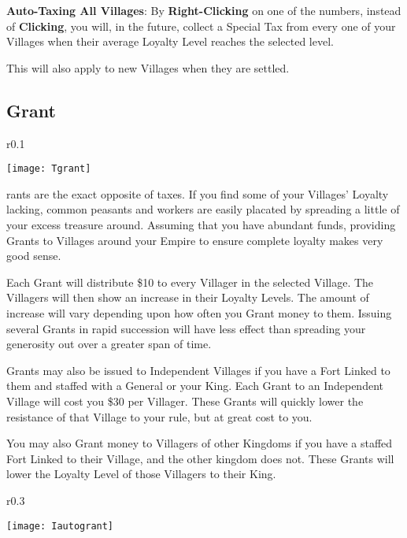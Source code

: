 \textbf{Auto-Taxing All Villages}: By \textbf{Right-Clicking} on one of the numbers, instead of \textbf{Clicking}, you will, in the future, collect a Special Tax from every one of your Villages when their average Loyalty Level reaches the selected level.

This will also apply to new Villages when they are settled.

\subsection{\textsf{Grant}}


\begin{wrapfigure}{r}{0.1\textwidth}
    \vspace{-20pt}
    \begin{center}
        \texttt{[image: Tgrant]}
    \end{center}
    \vspace{-20pt}
\end{wrapfigure}

rants are the exact opposite of taxes. If you find some of your Villages’ Loyalty lacking, common peasants and workers are easily placated by spreading a little of your excess treasure around. Assuming that you have abundant funds, providing Grants to Villages around your Empire to ensure complete loyalty makes very good sense.

Each Grant will distribute \$10 to every Villager in the selected Village. The Villagers will then show an increase in their Loyalty Levels. The amount of increase will vary depending upon how often you Grant money to them. Issuing several Grants in rapid succession will have less effect than spreading your generosity out over a greater span of time.

Grants may also be issued to Independent Villages if you have a Fort Linked to them and staffed with a General or your King. Each Grant to an Independent Village will cost you \$30 per Villager. These Grants will quickly lower the resistance of that Village to your rule, but at great cost to you.

You may also Grant money to Villagers of other Kingdoms if you have a staffed Fort Linked to their Village, and the other kingdom does not. These Grants will lower the Loyalty Level of those Villagers to their King.

\begin{wrapfigure}{r}{0.3\textwidth}
    \vspace{-20pt}
    \begin{center}
        \texttt{[image: Iautogrant]} %
    \end{center}
    \vspace{-20pt}
\end{wrapfigure}

